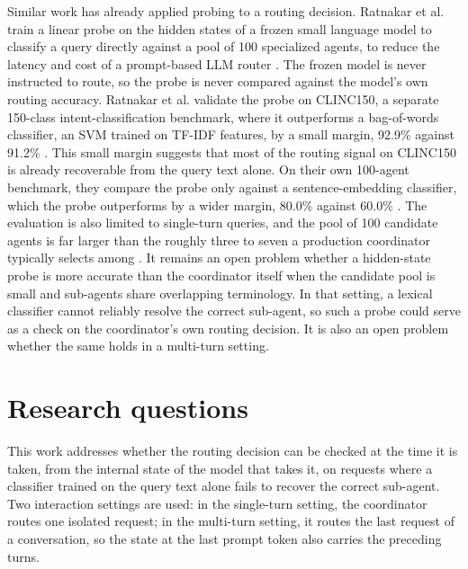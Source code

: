 Similar work has already applied probing to a routing decision. Ratnakar et al. train a linear probe on the hidden states of a frozen small language model to classify a query directly against a pool of 100 specialized agents, to reduce the latency and cost of a prompt-based LLM router \cite{ratnakarLatentGateLowLatencySemantic2026}. The frozen model is never instructed to route, so the probe is never compared against the model's own routing accuracy. Ratnakar et al. validate the probe on CLINC150, a separate 150-class intent-classification benchmark, where it outperforms a bag-of-words classifier, an SVM trained on TF-IDF features, by a small margin, 92.9\% against 91.2\% \cite{ratnakarLatentGateLowLatencySemantic2026}. This small margin suggests that most of the routing signal on CLINC150 is already recoverable from the query text alone. On their own 100-agent benchmark, they compare the probe only against a sentence-embedding classifier, which the probe outperforms by a wider margin, 80.0\% against 60.0\% \cite{ratnakarLatentGateLowLatencySemantic2026}. The evaluation is also limited to single-turn queries, and the pool of 100 candidate agents is far larger than the roughly three to seven a production coordinator typically selects among \cite{ratnakarLatentGateLowLatencySemantic2026}. It remains an open problem whether a hidden-state probe is more accurate than the coordinator itself when the candidate pool is small and sub-agents share overlapping terminology. In that setting, a lexical classifier cannot reliably resolve the correct sub-agent, so such a probe could serve as a check on the coordinator's own routing decision. It is also an open problem whether the same holds in a multi-turn setting.

\section{Research questions}

This work addresses whether the routing decision can be checked at the time it is taken, from the internal state of the model that takes it, on requests where a classifier trained on the query text alone fails to recover the correct sub-agent. Two interaction settings are used: in the single-turn setting, the coordinator routes one isolated request; in the multi-turn setting, it routes the last request of a conversation, so the state at the last prompt token also carries the preceding turns.
\label{rq:intro-rq1}


